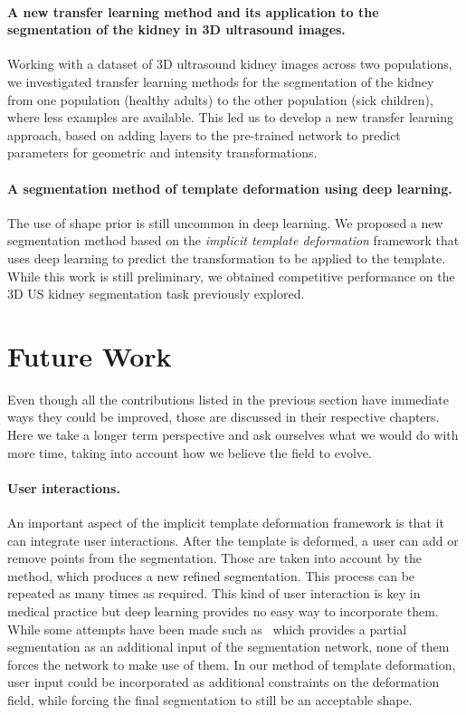 \paragraph*{A new transfer learning method and its application to the segmentation of the kidney in 3D ultrasound images.}
Working with a dataset of 3D ultrasound kidney images across two populations, we investigated transfer learning methods for the segmentation of the kidney from one population (healthy adults) to the other population (sick children), where less examples are available. This led us to develop a new transfer learning approach, based on adding layers to the pre-trained network to predict parameters for geometric and intensity transformations. 

\paragraph*{A segmentation method of template deformation using deep learning.}
The use of shape prior is still uncommon in deep learning. We proposed a new segmentation method based on the \textit{implicit template deformation} framework that uses deep learning to predict the transformation to be applied to the template. While this work is still preliminary, we obtained competitive performance on the 3D US kidney segmentation task previously explored.

\section{Future Work}

Even though all the contributions listed in the previous section have immediate ways they could be improved, those are discussed in their respective chapters. Here we take a longer term perspective and ask ourselves what we would do with more time, taking into account how we believe the field to evolve.

\paragraph*{User interactions.}
An important aspect of the implicit template deformation framework is that it can integrate user interactions. After the template is deformed, a user can add or remove points from the segmentation. Those are taken into account by the method, which produces a new refined segmentation. This process can be repeated as many times as required. This kind of user interaction is key in medical practice but deep learning provides no easy way to incorporate them. While some attempts have been made such as~\textcite{cicek2016MICCAI} which provides a partial segmentation as an additional input of the segmentation network, none of them forces the network to make use of them. In our method of template deformation, user input could be incorporated as additional constraints on the deformation field, while forcing the final segmentation to still be an acceptable shape.

